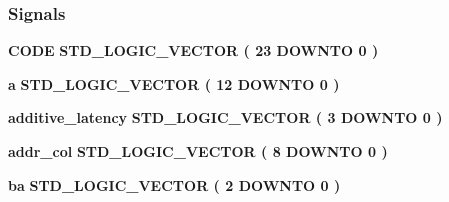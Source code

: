 \subsubsection*{Signals}
 \begin{DoxyCompactItemize}
\item 
{\bf C\+O\+DE} {\bfseries \textcolor{comment}{S\+T\+D\+\_\+\+L\+O\+G\+I\+C\+\_\+\+V\+E\+C\+T\+OR}\textcolor{vhdlchar}{ }\textcolor{vhdlchar}{(}\textcolor{vhdlchar}{ }\textcolor{vhdlchar}{ } \textcolor{vhdldigit}{23} \textcolor{vhdlchar}{ }\textcolor{keywordflow}{D\+O\+W\+N\+TO}\textcolor{vhdlchar}{ }\textcolor{vhdlchar}{ } \textcolor{vhdldigit}{0} \textcolor{vhdlchar}{ }\textcolor{vhdlchar}{)}\textcolor{vhdlchar}{ }} 
\item 
{\bf a} {\bfseries \textcolor{comment}{S\+T\+D\+\_\+\+L\+O\+G\+I\+C\+\_\+\+V\+E\+C\+T\+OR}\textcolor{vhdlchar}{ }\textcolor{vhdlchar}{(}\textcolor{vhdlchar}{ }\textcolor{vhdlchar}{ } \textcolor{vhdldigit}{12} \textcolor{vhdlchar}{ }\textcolor{keywordflow}{D\+O\+W\+N\+TO}\textcolor{vhdlchar}{ }\textcolor{vhdlchar}{ } \textcolor{vhdldigit}{0} \textcolor{vhdlchar}{ }\textcolor{vhdlchar}{)}\textcolor{vhdlchar}{ }} 
\item 
{\bf additive\+\_\+latency} {\bfseries \textcolor{comment}{S\+T\+D\+\_\+\+L\+O\+G\+I\+C\+\_\+\+V\+E\+C\+T\+OR}\textcolor{vhdlchar}{ }\textcolor{vhdlchar}{(}\textcolor{vhdlchar}{ }\textcolor{vhdlchar}{ } \textcolor{vhdldigit}{3} \textcolor{vhdlchar}{ }\textcolor{keywordflow}{D\+O\+W\+N\+TO}\textcolor{vhdlchar}{ }\textcolor{vhdlchar}{ } \textcolor{vhdldigit}{0} \textcolor{vhdlchar}{ }\textcolor{vhdlchar}{)}\textcolor{vhdlchar}{ }} 
\item 
{\bf addr\+\_\+col} {\bfseries \textcolor{comment}{S\+T\+D\+\_\+\+L\+O\+G\+I\+C\+\_\+\+V\+E\+C\+T\+OR}\textcolor{vhdlchar}{ }\textcolor{vhdlchar}{(}\textcolor{vhdlchar}{ }\textcolor{vhdlchar}{ } \textcolor{vhdldigit}{8} \textcolor{vhdlchar}{ }\textcolor{keywordflow}{D\+O\+W\+N\+TO}\textcolor{vhdlchar}{ }\textcolor{vhdlchar}{ } \textcolor{vhdldigit}{0} \textcolor{vhdlchar}{ }\textcolor{vhdlchar}{)}\textcolor{vhdlchar}{ }} 
\item 
{\bf ba} {\bfseries \textcolor{comment}{S\+T\+D\+\_\+\+L\+O\+G\+I\+C\+\_\+\+V\+E\+C\+T\+OR}\textcolor{vhdlchar}{ }\textcolor{vhdlchar}{(}\textcolor{vhdlchar}{ }\textcolor{vhdlchar}{ } \textcolor{vhdldigit}{2} \textcolor{vhdlchar}{ }\textcolor{keywordflow}{D\+O\+W\+N\+TO}\textcolor{vhdlchar}{ }\textcolor{vhdlchar}{ } \textcolor{vhdldigit}{0} \textcolor{vhdlchar}{ }\textcolor{vhdlchar}{)}\textcolor{vhdlchar}{ }} 

\end{DoxyCompactItemize}
